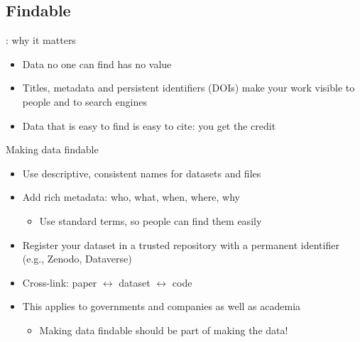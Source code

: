 \documentclass[aspectratio=169]{beamer}
\begin{document}
\subsection{Findable}
\begin{frame}{: why it matters}
\begin{itemize}
  \item Data no one can find has no value
  \item Titles, metadata and persistent identifiers (DOIs) make your work visible to people and to search engines
  \item Data that is easy to find is easy to cite: you get the credit
\end{itemize}
\end{frame}

\begin{frame}{Making data findable}
\begin{itemize}
  \item Use descriptive, consistent names for datasets and files
  \item Add rich metadata: who, what, when, where, why
    \begin{itemize}
    \item Use standard terms, so people can find them easily
    \end{itemize}
  \item Register your dataset in a trusted repository with a permanent identifier (e.g., Zenodo, Dataverse)
  \item Cross-link: paper $\leftrightarrow$ dataset $\leftrightarrow$ code
  \item This applies to governments and companies as well as academia
    \begin{itemize}
    \item Making data findable should be part of making the data!
    \end{itemize}
\end{itemize}
\end{frame}
\end{document}
